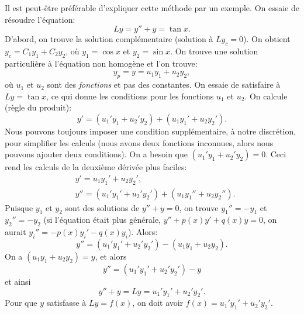 Il est peut-être préférable d'expliquer cette méthode par un exemple. 
On essaie de résoudre l'équation:  
\begin{equation*}
	Ly = y''+y = \tan x .
\end{equation*}
D'abord, on trouve la solution complémentaire (solution à $Ly_c = 0$).  
On obtient $y_c = C_1 y_1 + C_2 y_2$, où $y_1 = \cos x$ et $y_2 = \sin x$.
On trouve une solution particulière à l'équation non homogène et l'on trouve: 
\begin{equation*}
	y_p = y = u_1 y_1 + u_2 y_2, 
\end{equation*}
où $u_1$ et $u_2$ sont des \emph{fonctions} et pas des constantes.
On essaie de satisfaire à $Ly = \tan x$, ce qui donne les conditions pour les fonctions  $u_1$ et $u_2$.
On calcule (règle du produit):  
\begin{equation*}
	y' = (u_1' y_1 + u_2' y_2) + (u_1 y_1' + u_2 y_2').
\end{equation*}
Nous pouvons toujours imposer une condition supplémentaire, à notre discrétion, pour simplifier les calculs (nous avons deux fonctions inconnues, alors nous pouvons ajouter deux conditions). On a besoin que 
$(u_1' y_1 + u_2' y_2) = 0$.  Ceci rend les calculs de la deuxième dérivée plus faciles: 
\begin{align*}
	& y' = u_1 y_1' + u_2 y_2' , \\
	& y'' = (u_1' y_1' + u_2' y_2') + (u_1 y_1'' + u_2 y_2'') .
\end{align*}
Puisque $y_1$ et $y_2$ sont des solutions de $y''+y = 0$, on trouve 
$y_1'' = - y_1$ et $y_2'' = - y_2$ 
(si l'équation était plus générale,  $y''+p(x)y' +q(x)y = 0$, on aurait $y_i'' = -p(x)y_i' -q(x)y_i$).  
Alors: 
\begin{equation*}
	y'' = (u_1' y_1' + u_2' y_2') - (u_1 y_1 + u_2 y_2) .
\end{equation*}
On a $(u_1 y_1 + u_2 y_2) = y$, et alors
\begin{equation*}
	y'' = (u_1' y_1' + u_2' y_2') - y 
\end{equation*}
et ainsi 
\begin{equation*}
	y'' + y = Ly = u_1' y_1' + u_2' y_2' .
\end{equation*}
Pour  que $y$ satisfasse à $Ly = f(x)$, on doit avoir
$f(x) = u_1' y_1' + u_2' y_2'$.

